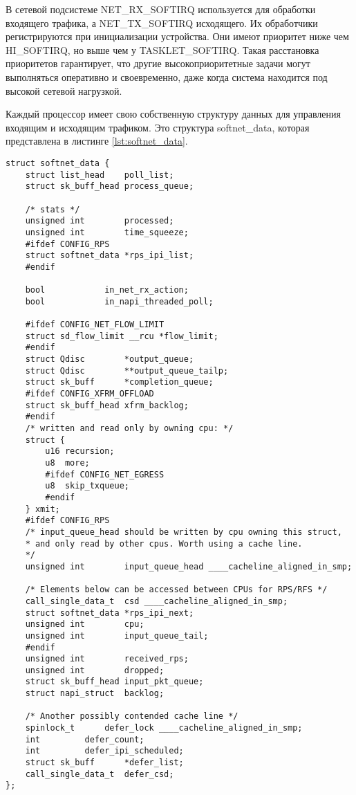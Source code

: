 В сетевой подсистеме NET\_RX\_SOFTIRQ используется для обработки входящего трафика, а NET\_TX\_SOFTIRQ исходящего. Их обработчики регистрируются при инициализации устройства. Они имеют приоритет ниже чем HI\_SOFTIRQ, но выше чем у TASKLET\_SOFTIRQ. Такая расстановка приоритетов гарантирует, что другие высокоприоритетные задачи могут выполняться оперативно и своевременно, даже когда система находится под высокой сетевой нагрузкой. 

Каждый процессор имеет свою собственную структуру данных для управления входящим и исходящим трафиком. Это структура  softnet\_data, которая представлена в листинге \ref{lst:softnet_data}.

\begin{center}
	\captionsetup{justification=raggedright,singlelinecheck=off}
	\begin{lstlisting}[label=lst:softnet_data,caption=Код структуры softnet\_data]
struct softnet_data {
	struct list_head	poll_list;
	struct sk_buff_head	process_queue;
	
	/* stats */
	unsigned int		processed;
	unsigned int		time_squeeze;
	#ifdef CONFIG_RPS
	struct softnet_data	*rps_ipi_list;
	#endif
	
	bool			in_net_rx_action;
	bool			in_napi_threaded_poll;
	
	#ifdef CONFIG_NET_FLOW_LIMIT
	struct sd_flow_limit __rcu *flow_limit;
	#endif
	struct Qdisc		*output_queue;
	struct Qdisc		**output_queue_tailp;
	struct sk_buff		*completion_queue;
	#ifdef CONFIG_XFRM_OFFLOAD
	struct sk_buff_head	xfrm_backlog;
	#endif
	/* written and read only by owning cpu: */
	struct {
		u16 recursion;
		u8  more;
		#ifdef CONFIG_NET_EGRESS
		u8  skip_txqueue;
		#endif
	} xmit;
	#ifdef CONFIG_RPS
	/* input_queue_head should be written by cpu owning this struct,
	* and only read by other cpus. Worth using a cache line.
	*/
	unsigned int		input_queue_head ____cacheline_aligned_in_smp;
	
	/* Elements below can be accessed between CPUs for RPS/RFS */
	call_single_data_t	csd ____cacheline_aligned_in_smp;
	struct softnet_data	*rps_ipi_next;
	unsigned int		cpu;
	unsigned int		input_queue_tail;
	#endif
	unsigned int		received_rps;
	unsigned int		dropped;
	struct sk_buff_head	input_pkt_queue;
	struct napi_struct	backlog;
	
	/* Another possibly contended cache line */
	spinlock_t		defer_lock ____cacheline_aligned_in_smp;
	int			defer_count;
	int			defer_ipi_scheduled;
	struct sk_buff		*defer_list;
	call_single_data_t	defer_csd;
};		
	\end{lstlisting}
\end{center}
\FloatBarrier

